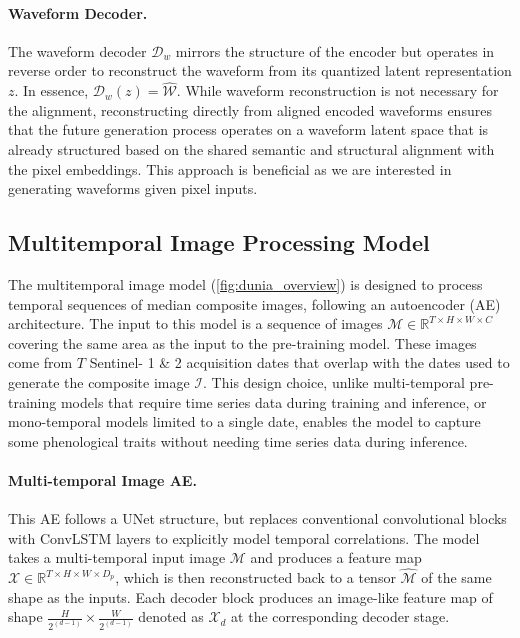 \paragraph{Waveform Decoder.} The waveform decoder $\mathcal{D}_w$ mirrors the structure of the encoder but operates in reverse order to reconstruct the waveform from its quantized latent representation $z$. In essence, $\mathcal{D}_w(z) = \hat{\mathcal{W}}$. While waveform reconstruction is not necessary for the alignment, reconstructing directly from aligned encoded waveforms ensures that the future generation process operates on a waveform latent space that is already structured based on the shared semantic and structural alignment with the pixel embeddings. This approach is beneficial as we are interested in generating waveforms given pixel inputs.

\subsection{Multitemporal Image Processing Model}\label{sec:multitemproal_ae} The multitemporal image model (\cref{fig:dunia_overview}) is designed to process temporal sequences of median composite images, following an autoencoder (AE) architecture. The input to this model is a sequence of images $\mathcal{M} \in \mathbb{R}^{T \times H \times W \times C}$ covering the same area as the input to the pre-training model. These images come from $T$ Sentinel- 1 \& 2 acquisition dates that overlap with the dates used to generate the composite image $\mathcal{I}$. This design choice, unlike multi-temporal pre-training models that require time series data during training and inference, or mono-temporal models limited to a single date, enables the model to capture some phenological traits without needing time series data during inference.

\paragraph{Multi-temporal Image AE.} This AE follows a UNet structure, but replaces conventional convolutional blocks with ConvLSTM \cite{shi2015convlstm} layers to explicitly model temporal correlations. The model takes a multi-temporal input image $\mathcal{M}$ and produces a feature map $\mathcal{X} \in \mathbb{R}^{T \times H \times W \times D_p}$, which is then reconstructed back to a tensor $\mathcal{\hat M}$ of the same shape as the inputs. Each decoder block produces an image-like feature map of shape $\frac{H}{2^{(d-1)}} \times \frac{W}{2^{(d-1)}}$ denoted as $\mathcal{X}_d$ at the corresponding decoder stage.

